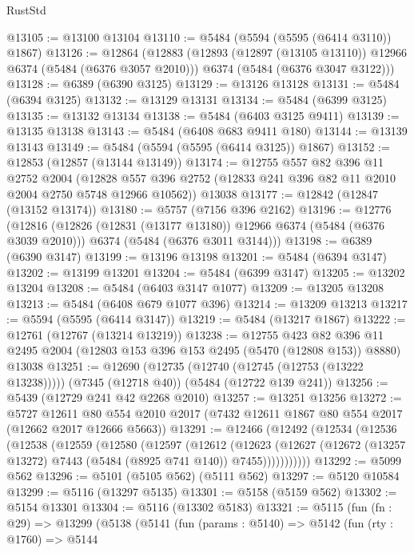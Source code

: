 \begin{lexlean}{RustStd}
\begin{coremodule}
{\begin{coremodule}
{{{{{{{{{{{{{{{{{{{{{{{{{{{{{{{@13105 := @13100 @13104
@13110 := @5484 (@5594 (@5595 (@6414 @3110)) @1867)
@13126 := @12864
    (@12883
      (@12893 (@12897 (@13105 @13110)) @12966 @6374 (@5484 (@6376 @3057 @2010)))
      @6374
      (@5484 (@6376 @3047 @3122)))
@13128 := @6389 (@6390 @3125)
@13129 := @13126 @13128
@13131 := @5484 (@6394 @3125)
@13132 := @13129 @13131
@13134 := @5484 (@6399 @3125)
@13135 := @13132 @13134
@13138 := @5484 (@6403 @3125 @9411)
@13139 := @13135 @13138
@13143 := @5484 (@6408 @683 @9411 @180)
@13144 := @13139 @13143
@13149 := @5484 (@5594 (@5595 (@6414 @3125)) @1867)
@13152 := @12853 (@12857 (@13144 @13149))
@13174 := @12755
    @557
    @82
    @396
    @11
    @2752
    @2004
    (@12828 @557 @396 @2752 (@12833 @241 @396 @82 @11 @2010 @2004 @2750 @5748 @12966 @10562))
    @13038
@13177 := @12842 (@12847 (@13152 @13174))
@13180 := @5757 (@7156 @396 @2162)
@13196 := @12776
    (@12816
      (@12826 (@12831 (@13177 @13180)) @12966 @6374 (@5484 (@6376 @3039 @2010)))
      @6374
      (@5484 (@6376 @3011 @3144)))
@13198 := @6389 (@6390 @3147)
@13199 := @13196 @13198
@13201 := @5484 (@6394 @3147)
@13202 := @13199 @13201
@13204 := @5484 (@6399 @3147)
@13205 := @13202 @13204
@13208 := @5484 (@6403 @3147 @1077)
@13209 := @13205 @13208
@13213 := @5484 (@6408 @679 @1077 @396)
@13214 := @13209 @13213
@13217 := @5594 (@5595 (@6414 @3147))
@13219 := @5484 (@13217 @1867)
@13222 := @12761 (@12767 (@13214 @13219))
@13238 := @12755
    @423
    @82
    @396
    @11
    @2495
    @2004
    (@12803 @153 @396 @153 @2495 (@5470 (@12808 @153)) @8880)
    @13038
@13251 := @12690
    (@12735 (@12740 (@12745 (@12753 (@13222 @13238)))))
    (@7345 (@12718 @40))
    (@5484 (@12722 @139 @241))
@13256 := @5439 (@12729 @241 @42 @2268 @2010)
@13257 := @13251 @13256
@13272 := @5727
    @12611
    @80
    @554
    @2010
    @2017
    (@7432 @12611 @1867 @80 @554 @2017 (@12662 @2017 @12666 @5663))
@13291 := @12466
    (@12492
      (@12534
        (@12536
          (@12538
            (@12559
              (@12580
                (@12597
                  (@12612
                    (@12623
                      (@12627
                        (@12672 (@13257 @13272) @7443 (@5484 (@8925 @741 @140)) @7455)))))))))))
@13292 := @5099 @562
@13296 := @5101 (@5105 @562) (@5111 @562)
@13297 := @5120 @10584
@13299 := @5116 (@13297 @5135)
@13301 := @5158 (@5159 @562)
@13302 := @5154 @13301
@13304 := @5116 (@13302 @5183)
@13321 := @5115
    (fun (fn : @29) =>
    @13299
      (@5138
        (@5141
          (fun (params : @5140) =>
          @5142
            (fun (rty : @1760) =>
            @5144
}}}}}}}}}}}}}}}}}}}}}}}}}}}}}}}
\end{coremodule}}
\end{coremodule}
\end{lexlean}
